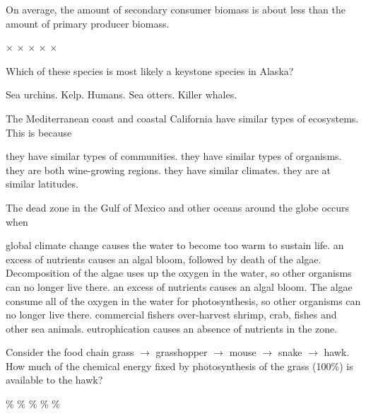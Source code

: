 \question
On average, the amount of secondary consumer biomass is about \underline{\hspace{2cm}} less than the amount of primary producer biomass. 
\begin{choices}
$\times$ %
$\times$ %
$\times$ %
$\times$ %
$\times$%
\end{choices}

\question
Which of these species is most likely a keystone species in Alaska?

\begin{choices}
\choice Sea urchins.  
\choice Kelp.  
\choice Humans.  
\correctchoice Sea otters. 
\choice Killer whales. 
\end{choices}

\question
The Mediterranean coast and coastal California have similar types of ecosystems. This is because

\begin{choices}
\choice they have similar types of communities.
\choice they have similar types of organisms.
\choice they are both wine-growing regions.
\correctchoice they have similar climates.
\choice they are at similar latitudes.
\end{choices}

\question
The dead zone in the Gulf of Mexico and other oceans around the globe occurs when

\begin{choices}
\choice global climate change causes the water to become too warm to sustain life.
\correctchoice an excess of nutrients causes an algal bloom, followed by death of the algae. Decomposition of the algae uses up the oxygen in the water, so other organisms can no longer live there.
\choice an excess of nutrients causes an algal bloom. The algae consume all of the oxygen in the water for photosynthesis, so other organisms can no longer live there.
\choice commercial fishers over-harvest shrimp, crab, fishes and other sea animals.
\choice eutrophication causes an absence of nutrients in the zone.
\end{choices}

\question
Consider the food chain grass $\to$ grasshopper $\to$ mouse $\to$ snake $\to$ hawk. How much of the chemical energy fixed by photosynthesis of the grass (100\%) is available to the hawk?

\begin{choices}
	\%
	\% %
	\% %
	\% %
	\% %
\end{choices}

